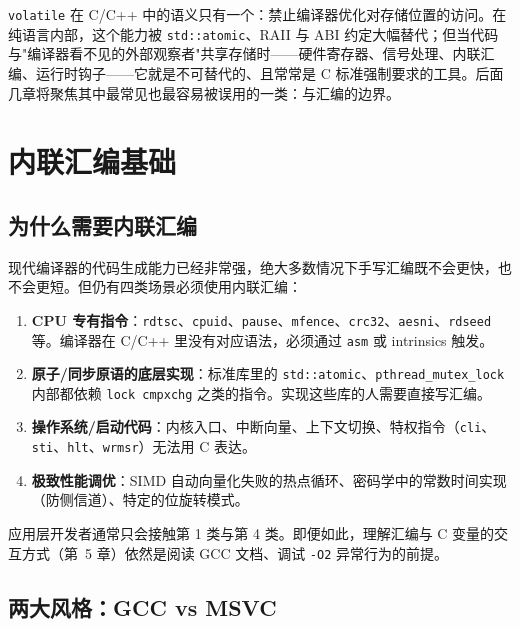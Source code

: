 \documentclass[12pt,a4paper,fontset=fandol]{ctexbook}
\newcommand{\cpp}[1]{C++#1}
\newcommand{\kw}[1]{\texttt{#1}}
\begin{document}
\kw{volatile} 在 C/\allowbreak{}\cpp{} 中的语义只有一个：禁止编译器优化对存储位置的访问。在纯语言内部，这个能力被 \texttt{std::atomic}、RAII 与 ABI 约定大幅替代；但当代码与"编译器看不见的外部观察者"共享存储时——硬件寄存器、信号处理、内联汇编、运行时钩子——它就是不可替代的、且常常是 C 标准强制要求的工具。后面几章将聚焦其中最常见也最容易被误用的一类：与汇编的边界。

\chapter{内联汇编基础}\label{ch:asm-basics}

\section{为什么需要内联汇编}\label{sec:why-asm}

现代编译器的代码生成能力已经非常强，绝大多数情况下手写汇编既不会更快，也不会更短。但仍有四类场景必须使用内联汇编：

\begin{enumerate}[nosep]
  \item \textbf{CPU 专有指令}：\texttt{rdtsc}、\texttt{cpuid}、\texttt{pause}、\texttt{mfence}、\texttt{crc32}、\texttt{aesni}、\texttt{rdseed} 等。编译器在 C/\allowbreak{}\cpp{} 里没有对应语法，必须通过 \texttt{asm} 或 intrinsics 触发。
  \item \textbf{原子/同步原语的底层实现}：标准库里的 \texttt{std::atomic}、\texttt{pthread\_mutex\_lock} 内部都依赖 \texttt{lock cmpxchg} 之类的指令。实现这些库的人需要直接写汇编。
  \item \textbf{操作系统/启动代码}：内核入口、中断向量、上下文切换、特权指令（\texttt{cli}、\texttt{sti}、\texttt{hlt}、\texttt{wrmsr}）无法用 C 表达。
  \item \textbf{极致性能调优}：SIMD 自动向量化失败的热点循环、密码学中的常数时间实现（防侧信道）、特定的位旋转模式。
\end{enumerate}

应用层开发者通常只会接触第 1 类与第 4 类。即便如此，理解汇编与 C 变量的交互方式（第~5 章）依然是阅读 GCC 文档、调试 \texttt{-O2} 异常行为的前提。

\section{两大风格：GCC vs MSVC}\label{sec:two-styles}
\end{document}
